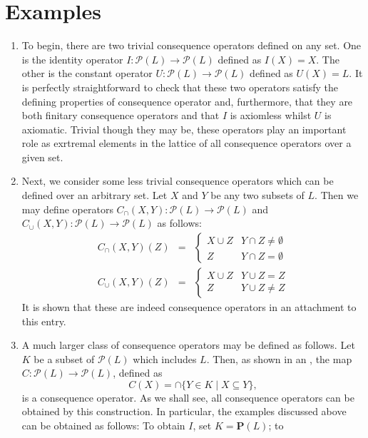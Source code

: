 \documentclass[12pt]{article}
\begin{document}
\section{Examples}

\begin{enumerate}
\item
To begin, there are two trivial consequence operators defined on any set.
One is the identity operator $I \colon \mathcal{P}(L) \to \mathcal{P}(L)$ defined as $I(X) = X$.  The other is the constant operator $U \colon \mathcal{P}(L) \to \mathcal{P}(L)$ defined as $U(X) = L$.  It is perfectly
straightforward to check that these two operators satisfy the defining 
properties of consequence operator and, furthermore, that they are both
finitary consequence operators and that $I$ is axiomless whilst $U$ is
axiomatic.  Trivial though they may be, these operators play an important 
role as exrtremal elements in the lattice of all consequence operators
over a given set.
\item
Next, we consider some less trivial consequence operators which can be 
defined over an arbitrary set.  Let $X$ and $Y$ be any two subsets of $L$.  
Then we may define operators $C_\cap (X,Y) \colon \mathcal{P}(L) \to \mathcal{P}(L)$
and $C_\cup (X,Y) \colon \mathcal{P}(L) \to \mathcal{P}(L)$ as follows:
\begin{eqnarray*} C_\cap (X,Y)(Z) &=& \begin{cases} X \cup Z & Y \cap Z 
\not= \emptyset \\ Z & Y \cap Z = \emptyset \end{cases} \\
C_\cup (X,Y)(Z) &=& \begin{cases} X \cup Z & Y \cup Z = Z \\ Z & Y \cup Z 
\not= Z \end{cases} \end{eqnarray*}
It is shown that these are indeed consequence operators in an attachment to
this entry.
\item
A much larger class of consequence operators may be defined as follows.
Let $K$ be a subset of $\mathcal{P}(L)$ which includes $L$.  Then, as
shown in an , the
map $C \colon \mathcal{P}(L) \to \mathcal{P}(L)$, defined as
\[C(X) = \cap \{ Y \in K \mid X \subseteq Y \},\]
is a consequence operator.  As we shall see, all consequence operators
can be obtained by this construction.  In particular, the examples discussed
above can be obtained as follows:  To obtain $I$, set $K = \mathbf{P}(L)$; to

\end{enumerate}
\end{document}
